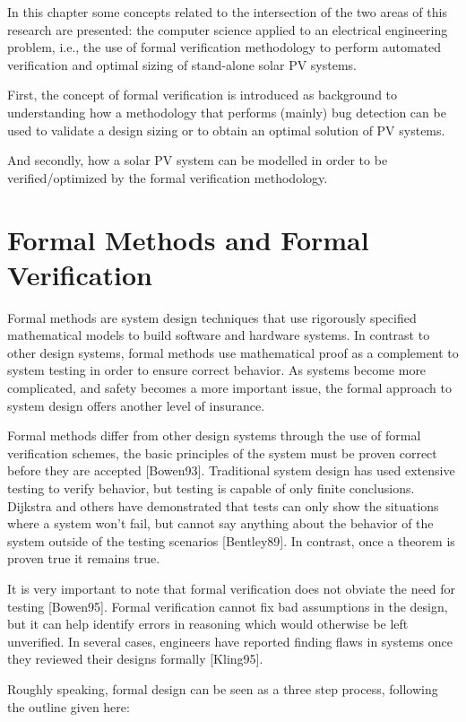 In this chapter some concepts related to the intersection of the two areas of this research are presented: the computer science applied to an electrical engineering problem, i.e., the use of formal verification methodology to perform automated verification and optimal sizing of stand-alone solar PV systems.

First, the concept of formal verification is introduced as background to understanding how a methodology that performs (mainly) bug detection can be used to validate a design sizing or to obtain an optimal solution of PV systems.

And secondly, how a solar PV system can be modelled in order to be verified/optimized by the formal verification methodology.

\section{Formal Methods and Formal Verification}
Formal methods are system design techniques that use rigorously specified mathematical models to build software and hardware systems. In contrast to other design systems, formal methods use mathematical proof as a complement to system testing in order to ensure correct behavior. As systems become more complicated, and safety becomes a more important issue, the formal approach to system design offers another level of insurance.

Formal methods differ from other design systems through the use of formal verification schemes, the basic principles of the system must be proven correct before they are accepted [Bowen93]. Traditional system design has used extensive testing to verify behavior, but testing is capable of only finite conclusions. Dijkstra and others have demonstrated that tests can only show the situations where a system won't fail, but cannot say anything about the behavior of the system outside of the testing scenarios [Bentley89]. In contrast, once a theorem is proven true it remains true.

It is very important to note that formal verification does not obviate the need for testing [Bowen95]. Formal verification cannot fix bad assumptions in the design, but it can help identify errors in reasoning which would otherwise be left unverified. In several cases, engineers have reported finding flaws in systems once they reviewed their designs formally [Kling95].

Roughly speaking, formal design can be seen as a three step process, following the outline given here:

